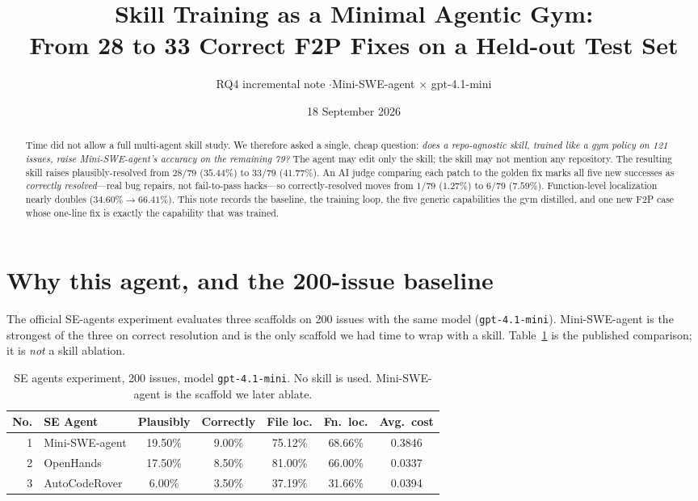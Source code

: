 \documentclass[11pt,a4paper]{article}
\title{Skill Training as a Minimal Agentic Gym:\\
From 28 to 33 Correct F2P Fixes on a Held-out Test Set}
\author{RQ4 incremental note \quad$\cdot$\quad Mini-SWE-agent $\times$ gpt-4.1-mini}
\date{18 September 2026}
\begin{document}
\maketitle

\begin{abstract}
Time did not allow a full multi-agent skill study. We therefore
asked a single, cheap question: \emph{does a repo-agnostic skill,
trained like a gym policy on 121 issues, raise Mini-SWE-agent's
accuracy on the remaining 79?} The agent may edit only the skill;
the skill may not mention any repository. The resulting skill
raises plausibly-resolved from $28/79$ ($35.44\%$) to $33/79$
($41.77\%$). An AI judge comparing each patch to the golden fix
marks all five new successes as \emph{correctly resolved}---real
bug repairs, not fail-to-pass hacks---so correctly-resolved moves
from $1/79$ ($1.27\%$) to $6/79$ ($7.59\%$). Function-level
localization nearly doubles ($34.60\% \rightarrow 66.41\%$).
This note records the baseline, the training loop, the five
generic capabilities the gym distilled, and one new F2P case
whose one-line fix is exactly the capability that was trained.
\end{abstract}

\section{Why this agent, and the 200-issue baseline}
\label{sec:baseline}

The official SE-agents experiment evaluates three scaffolds on
200 issues with the same model (\texttt{gpt-4.1-mini}). Mini-SWE-agent
is the strongest of the three on correct resolution and is the
only scaffold we had time to wrap with a skill. Table~\ref{tab:se200}
is the published comparison; it is \emph{not} a skill ablation.

\begin{table}[H]
\centering
\caption{SE agents experiment, 200 issues, model \texttt{gpt-4.1-mini}.
No skill is used. Mini-SWE-agent is the scaffold we later ablate.}
\label{tab:se200}
\small
\begin{tabular}{@{}rlccccc@{}}
\toprule
No. & SE Agent & Plausibly & Correctly & File loc. & Fn.\ loc. & Avg.\ cost \\
\midrule
1 & Mini-SWE-agent & 19.50\% & 9.00\% & 75.12\% & 68.66\% & 0.3846 \\
2 & OpenHands      & 17.50\% & 8.50\% & 81.00\% & 66.00\% & 0.0337 \\
3 & AutoCodeRover  &  6.00\% & 3.50\% & 37.19\% & 31.66\% & 0.0394 \\
\bottomrule
\end{tabular}
\end{table}
\end{document}
